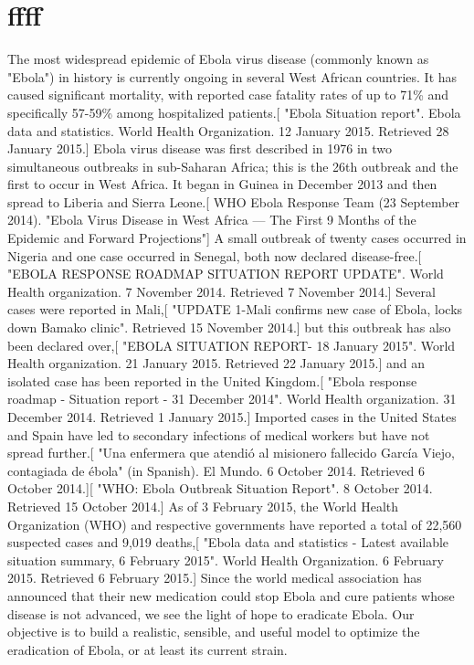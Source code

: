 \section{ffff}
The most widespread epidemic of Ebola virus disease (commonly known as "Ebola") in history is currently ongoing in several West African
countries. \cite{url1,url2} It has caused significant mortality, with reported case fatality rates of up to 71\% \cite{url3}  and specifically 57-59\% among hospitalized patients.[ "Ebola Situation report". Ebola data and statistics. World Health Organization. 12 January 2015. Retrieved 28 January 2015.] Ebola virus disease was first described in 1976 in two simultaneous outbreaks in sub-Saharan Africa; this is the 26th outbreak and the first to occur in West Africa. It began in Guinea in December 2013 and then spread to Liberia and Sierra Leone.[ WHO Ebola Response Team (23 September 2014). "Ebola Virus Disease in West Africa — The First 9 Months of the Epidemic and Forward Projections"] A small outbreak of twenty cases occurred in Nigeria and one case occurred in Senegal, both now declared disease-free.[ "EBOLA RESPONSE ROADMAP SITUATION REPORT UPDATE". World Health organization. 7 November 2014. Retrieved 7 November 2014.] Several cases were reported in Mali,[ "UPDATE 1-Mali confirms new case of Ebola, locks down Bamako clinic". Retrieved 15 November 2014.] but this outbreak has also been declared over,[ "EBOLA SITUATION REPORT- 18 January 2015". World Health organization. 21 January 2015. Retrieved 22 January 2015.] and an isolated case has been reported in the United Kingdom.[ "Ebola response roadmap - Situation report - 31 December 2014". World Health organization. 31 December 2014. Retrieved 1 January 2015.] Imported cases in the United States and Spain have led to secondary infections of medical workers but have not spread further.[ "Una enfermera que atendió al misionero fallecido García Viejo, contagiada de ébola" (in Spanish). El Mundo. 6 October 2014. Retrieved 6 October 2014.][ "WHO: Ebola Outbreak Situation Report". 8 October 2014. Retrieved 15 October 2014.] As of 3 February 2015, the World Health Organization (WHO) and respective governments have reported a total of 22,560 suspected cases and 9,019 deaths,[ "Ebola data and statistics - Latest available situation summary, 6 February 2015". World Health Organization. 6 February 2015. Retrieved 6 February 2015.]
Since the world medical association has announced that their new medication could stop Ebola and cure patients whose disease is not advanced, we see the light of hope to eradicate Ebola. Our objective is to build a realistic, sensible, and useful model to optimize the eradication of Ebola, or at least its current strain.
